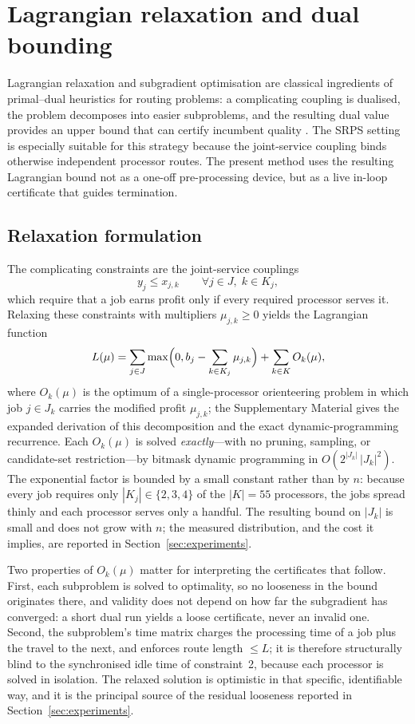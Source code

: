 \documentclass[preprint,12pt]{elsarticle}
\begin{document}
\section{Lagrangian relaxation and dual bounding}\label{sec:lagrangian}

Lagrangian relaxation and subgradient optimisation are classical ingredients of primal--dual heuristics for routing problems: a complicating coupling is dualised, the problem decomposes into easier subproblems, and the resulting dual value provides an upper bound that can certify incumbent quality \cite{KohlMadsen1997VRPTW,Kohl1999LagrangeVRPTW}. The SRPS setting is especially suitable for this strategy because the joint-service coupling binds otherwise independent processor routes. The present method uses the resulting Lagrangian bound not as a one-off pre-processing device, but as a live in-loop certificate that guides termination.

\subsection{Relaxation formulation}

The complicating constraints are the joint-service couplings
\[
y_j \le x_{j,k} \qquad \forall j\in J,\; k\in K_j,
\]
which require that a job earns profit only if every required processor serves it. Relaxing these constraints with multipliers $\mu_{j,k}\ge 0$ yields the Lagrangian function
\[
L(\mu) = \sum_{j\in J} \max\Bigl(0, b_j - \sum_{k\in K_j}\mu_{j,k}\Bigr) + \sum_{k\in K} O_k(\mu),
\]
where $O_k(\mu)$ is the optimum of a single-processor orienteering problem in which job $j\in J_k$ carries the modified profit $\mu_{j,k}$; the Supplementary Material gives the expanded derivation of this decomposition and the exact dynamic-programming recurrence. Each $O_k(\mu)$ is solved \emph{exactly}---with no pruning, sampling, or candidate-set restriction---by bitmask dynamic programming in $O(2^{|J_k|}\,|J_k|^2)$. The exponential factor is bounded by a small constant rather than by $n$: because every job requires only $|K_j|\in\{2,3,4\}$ of the $|K|=55$ processors, the jobs spread thinly and each processor serves only a handful. The resulting bound on $|J_k|$ is small and does not grow with $n$; the measured distribution, and the cost it implies, are reported in Section~\ref{sec:experiments}.

Two properties of $O_k(\mu)$ matter for interpreting the certificates that follow.
First, each subproblem is solved to optimality, so no looseness in the bound
originates there, and validity does not depend on how far the subgradient has
converged: a short dual run yields a loose certificate, never an invalid one.
Second, the subproblem's time matrix charges the processing time of a job plus
the travel to the next, and enforces route length $\le L$; it is therefore
structurally blind to the synchronised idle time of constraint~2, because each
processor is solved in isolation. The relaxed solution is optimistic in that
specific, identifiable way, and it is the principal source of the residual
looseness reported in Section~\ref{sec:experiments}.
\end{document}
